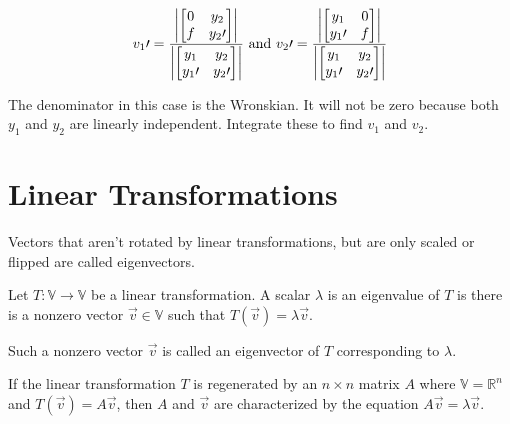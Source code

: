         \[
            v_1\prime = \frac{\left\lvert \left[ \begin{matrix}
                0 & y_2\\
                f & y_2\prime\\
            \end{matrix} \right] \right\rvert}{\left\lvert \left[ \begin{matrix}
                y_1 & y_2\\
                y_1\prime & y_2\prime\\
            \end{matrix} \right] \right\rvert}
            \text{ and }
            v_2\prime = \frac{\left\lvert \left[ \begin{matrix}
                y_1 & 0\\
                y_1\prime & f\\
            \end{matrix} \right] \right\rvert}{\left\lvert \left[ \begin{matrix}
                y_1 & y_2\\
                y_1\prime & y_2\prime\\
            \end{matrix} \right] \right\rvert}
        \]

    The denominator in this case is the Wronskian. It will not be zero because both $y_1$ and $y_2$ are linearly independent. Integrate these to find $v_1$ and $v_2$.

\section{Linear Transformations}
Vectors that aren't rotated by linear transformations, but are only scaled or flipped are called eigenvectors.

\begin{thm}
    Let $T: \mathbb{V} \to \mathbb{V}$ be a linear transformation. A scalar $\lambda$ is an eigenvalue of $T$ is there is a nonzero vector $\vec{v} \in \mathbb{V}$ such that $T(\vec{v}) = \lambda \vec{v}$.

    Such a nonzero vector $\vec{v}$ is called an eigenvector of $T$ corresponding to $\lambda$.

    If the linear transformation $T$ is regenerated by an $n\times n$ matrix $A$ where $\mathbb{V} = \mathbb{R}^n$ and $T(\vec{v}) = A \vec{v}$, then $A$ and $\vec{v}$ are characterized by the equation $A \vec{v} = \lambda \vec{v}$.
\end{thm}

